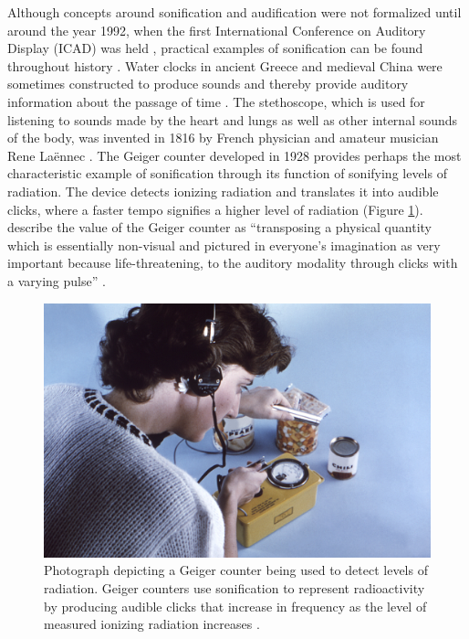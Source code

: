 \documentclass[10pt,a4paper,onecolumn]{article}
\begin{document}
Although concepts around sonification and audification were not formalized until around the year 1992, when the first International Conference on Auditory Display (ICAD) was held \autocite{dubusSonificationPhysicalQuantities2011}, practical examples of sonification can be found throughout history \autocite{dubusInteractiveSonificationMotion2013}. Water clocks in ancient Greece and medieval China were sometimes constructed to produce sounds and thereby provide auditory information about the passage of time \autocite{dubusSonificationPhysicalQuantities2011}. The stethoscope, which is used for listening to sounds made by the heart and lungs as well as other internal sounds of the body, was invented in 1816 by French physician and amateur musician Rene Laënnec \autocite{roguinReneTheophileHyacinthe2006}. The Geiger counter developed in 1928 provides perhaps the most characteristic example of sonification through its function of sonifying levels of radiation. The device detects ionizing radiation and translates it into audible clicks, where a faster tempo signifies a higher level of radiation (Figure \ref{fig:geiger-counter}). \textcite{dubusSonificationPhysicalQuantities2011} describe the value of the Geiger counter as ``transposing a physical quantity which is essentially non-visual and pictured in everyone's imagination as very important because life-threatening, to the auditory modality through clicks with a varying pulse'' \autocite[p.~1]{dubusSonificationPhysicalQuantities2011}.



\begin{figure}[h]

{\centering \includegraphics[width=1\linewidth]{figures/Geiger_counter_usage} 

}

\caption{Photograph depicting a Geiger counter being used to detect levels of radiation. Geiger counters use sonification to represent radioactivity by producing audible clicks that increase in frequency as the level of measured ionizing radiation increases \autocite{dobsonDetailsPublicHealth1963}.}\label{fig:geiger-counter}
\end{figure}
\end{document}
